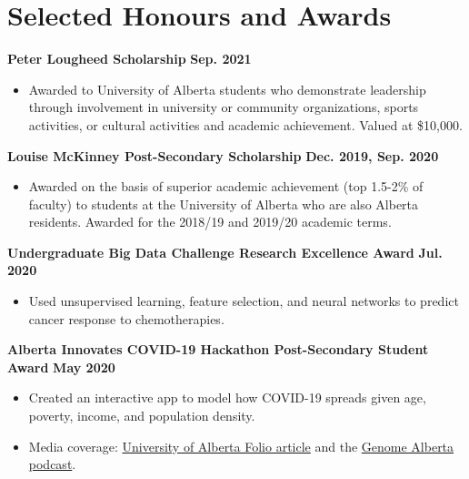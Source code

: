 \documentclass{article}
\begin{document}


\section*{\textcolor{my_colour}{Selected Honours and Awards}}
\vspace{-.25em} \hrulefill \vspace{.25em}

\textbf{Peter Lougheed Scholarship} \hfill \textbf{Sep. 2021}
\begin{itemize}
    \item Awarded to University of Alberta students who demonstrate leadership through involvement in university or community organizations, sports activities, or cultural activities and academic achievement. Valued at \$10,000.
\end{itemize} \vspace{1em}

\textbf{Louise McKinney Post-Secondary Scholarship} \hfill \textbf{Dec. 2019, Sep. 2020}
\begin{itemize}
    \item Awarded on the basis of superior academic achievement (top 1.5-2\% of faculty) to students at the University of Alberta who are also Alberta residents. Awarded for the 2018/19 and 2019/20 academic terms.
\end{itemize} \vspace{1em}

\textbf{Undergraduate Big Data Challenge Research Excellence Award} \hfill \textbf{Jul. 2020}
\begin{itemize}
    \item Used unsupervised learning, feature selection, and neural networks to predict cancer response to chemotherapies.
\end{itemize} \vspace{1em}

\textbf{Alberta Innovates COVID-19 Hackathon Post-Secondary Student Award} \hfill \textbf{May 2020}
\begin{itemize}
    \item Created an interactive app to model how COVID-19 spreads given age, poverty, income, and population density.
    \item Media coverage: \href{https://www.folio.ca/students-develop-online-tool-to-predict-covid-19-spread-based-on-demographics/}{University of Alberta Folio article} and the \href{https://genomealberta.ca/genomics/genomics_blog_08182001.aspx}{Genome Alberta podcast}.
\end{itemize} \vspace{1em}
\end{document}

